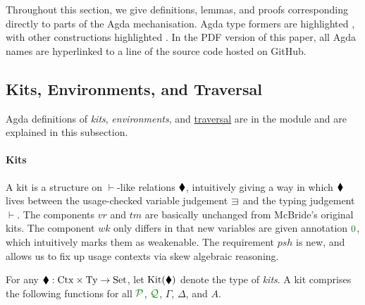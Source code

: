 \documentclass[submission,copyright,creativecommons]{eptcs}
\begin{document}
Throughout this section, we give definitions, lemmas, and proofs corresponding
directly to parts of the Agda mechanisation.
Agda type formers are highlighted , with other constructions
highlighted .
In the PDF version of this paper, all Agda names are hyperlinked to a line of
the source code hosted on GitHub.


\subsection{Kits, Environments, and Traversal}

Agda definitions of \emph{kits}, \emph{environments}, and
\hyperref[thm:trav]{traversal} are in the module
\href{https://github.com/laMudri/generic-lr/blob/lin/tlla-submission-2021/src/Specific/Syntax/Traversal.agda\#L9}{}
and are explained in this subsection.

\paragraph{Kits}
A kit is a structure on $\vdash$-like relations $\mathbin{\blacklozenge}$, intuitively
giving a way in which $\mathbin{\blacklozenge}$ lives between the usage-checked variable
judgement $\lvar$ and the typing judgement $\vdash$.
The components $\mathit{vr}$ and $\mathit{tm}$ are basically unchanged from
McBride's original kits.
The component $\mathit{wk}$ only differs in that new variables are given
annotation $\rescomment 0$, which intuitively marks them as weakenable.
The requirement $\mathit{psh}$ is new, and allows us to fix up usage contexts
via skew algebraic reasoning.

\begin{definition}\label{def:kit}
  For any $\mathbin{\blacklozenge} : \mathrm{Ctx} \times \mathrm{Ty} \to \mathrm{Set}$, let
  $\operatorname{Kit}(\mathbin{\blacklozenge})$ denote the type of \emph{kits}.
  A kit comprises the following functions for all $\resctx P$, $\resctx Q$,
  $\Gamma$, $\Delta$, and $A$.
\end{definition}
\end{document}

